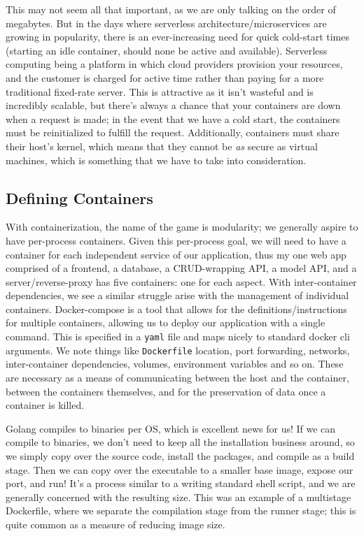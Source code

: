\documentclass[11pt, twoside, reqno]{book}
\begin{document}
This may not seem all that important, as we are only talking on the order of megabytes. But in the days where serverless architecture/microservices are growing in popularity, there is an ever-increasing need for quick cold-start times (starting an idle container, should none be active and available). Serverless computing being a platform in which cloud providers provision your resources, and the customer is charged for active time rather than paying for a more traditional fixed-rate server. This is attractive as it isn't wasteful and is incredibly scalable, but there's always a chance that your containers are down when a request is made; in the event that we have a cold start, the containers must be reinitialized to fulfill the request. Additionally, containers must share their host's kernel, which means that they cannot be \textit{as} secure as virtual machines, which is something that we have to take into consideration.

\subsection{Defining Containers}

With containerization, the name of the game is modularity; we generally aspire to have per-process containers. Given this per-process goal, we will need to have a container for each independent service of our application, thus my one web app comprised of a frontend, a database, a CRUD-wrapping API, a model API, and a server/reverse-proxy has five containers: one for each aspect. With inter-container dependencies, we see a similar struggle arise with the management of individual containers. Docker-compose is a tool that allows for the definitions/instructions for multiple containers, allowing us to deploy our application with a single command. This is specified in a \texttt{yaml} file and maps nicely to standard docker cli arguments. We note things like \texttt{Dockerfile} location, port forwarding, networks, inter-container dependencies, volumes, environment variables and so on. These are necessary as a means of communicating between the host and the container, between the containers themselves, and for the preservation of data once a container is killed.

\label{Go CRUD API Dockerfile}

Golang compiles to binaries per OS, which is excellent news for us! If we can compile to binaries, we don't need to keep all the installation business around, so we simply copy over the source code, install the packages, and compile as a build stage. Then we can copy over the executable to a smaller base image, expose our port, and run! It's a process similar to a writing standard shell script, and we are generally concerned with the resulting size. This was an example of a multistage Dockerfile, where we separate the compilation stage from the runner stage; this is quite common as a measure of reducing image size.
\end{document}
